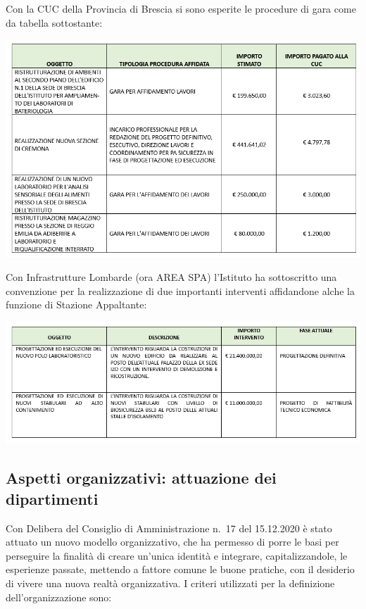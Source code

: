 \documentclass[
  12pt,
]{article}
\begin{document}
Con la CUC della Provincia di Brescia si sono esperite le procedure di
gara come da tabella sottostante:

\begin{center}\includegraphics[width=0.9\linewidth]{figure/gare1} \end{center}

Con Infrastrutture Lombarde (ora AREA SPA) l'Istituto ha sottoscritto
una convenzione per la realizzazione di due importanti interventi
affidandone alche la funzione di Stazione Appaltante:

\begin{center}\includegraphics[width=0.9\linewidth]{figure/gare2} \end{center}

\hypertarget{aspetti-organizzativi-attuazione-dei-dipartimenti}{%
\subsection{Aspetti organizzativi: attuazione dei
dipartimenti}\label{aspetti-organizzativi-attuazione-dei-dipartimenti}}

Con Delibera del Consiglio di Amministrazione n.~17 del 15.12.2020 è
stato attuato un nuovo modello organizzativo, che ha permesso di porre
le basi per perseguire la finalità di creare un'unica identità e
integrare, capitalizzandole, le esperienze passate, mettendo a fattore
comune le buone pratiche, con il desiderio di vivere una nuova realtà
organizzativa. I criteri utilizzati per la definizione
dell'organizzazione sono:
\end{document}
